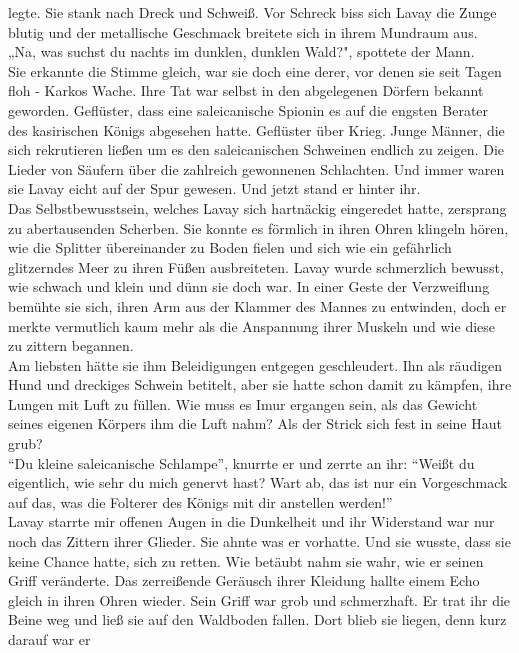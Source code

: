 legte. Sie stank nach Dreck und Schweiß. Vor Schreck biss sich Lavay die Zunge blutig und der 
metallische Geschmack breitete sich in ihrem Mundraum aus.\\
„Na, was suchst du nachts im dunklen, dunklen Wald?", spottete der Mann.\\
Sie erkannte die Stimme gleich, war sie doch eine derer, vor denen sie seit Tagen floh - Karkos 
Wache. Ihre Tat war selbst in den abgelegenen Dörfern bekannt geworden. Geflüster, dass eine 
saleicanische Spionin es auf die engsten Berater des kasirischen Königs abgesehen hatte. Geflüster 
über Krieg. Junge Männer, die sich rekrutieren ließen um es den saleicanischen Schweinen endlich zu 
zeigen. Die Lieder von Säufern über die zahlreich gewonnenen Schlachten. Und immer waren sie Lavay 
eicht auf der Spur gewesen. Und jetzt stand er hinter ihr.\\
Das Selbstbewusstsein, welches Lavay sich hartnäckig eingeredet hatte, zersprang zu abertausenden 
Scherben. Sie konnte es förmlich in ihren Ohren klingeln hören, wie die Splitter übereinander zu 
Boden fielen und sich wie ein gefährlich glitzerndes Meer zu ihren Füßen ausbreiteten. Lavay wurde 
schmerzlich bewusst, wie schwach und klein und dünn sie doch war. In einer Geste der Verzweiflung 
bemühte sie sich, ihren Arm aus der Klammer des Mannes zu entwinden, doch er merkte vermutlich kaum 
mehr als die Anspannung ihrer Muskeln und wie diese zu zittern begannen.\\
Am liebsten hätte sie ihm Beleidigungen entgegen geschleudert. Ihn als räudigen Hund und dreckiges 
Schwein betitelt, aber sie hatte schon damit zu kämpfen, ihre Lungen mit Luft zu füllen. Wie muss 
es Imur ergangen sein, als das Gewicht seines eigenen Körpers ihm die Luft nahm? Als der Strick 
sich fest in seine Haut grub?\\
``Du kleine saleicanische Schlampe'', knurrte er und zerrte an ihr: ``Weißt du eigentlich, wie 
sehr du mich genervt hast? Wart ab, das ist nur ein Vorgeschmack auf das, was die Folterer des 
Königs mit dir anstellen werden!''\\
Lavay starrte mir offenen Augen in die Dunkelheit und ihr Widerstand war nur noch das Zittern ihrer 
Glieder. Sie ahnte was er vorhatte. Und sie wusste, dass sie keine Chance hatte, sich zu retten. Wie 
betäubt nahm sie wahr, wie er seinen Griff veränderte. Das zerreißende Geräusch ihrer Kleidung 
hallte einem Echo gleich in ihren Ohren wieder. Sein Griff war grob und schmerzhaft. Er trat ihr die 
Beine weg und ließ sie auf den Waldboden fallen. Dort blieb sie liegen, denn kurz darauf war er 
